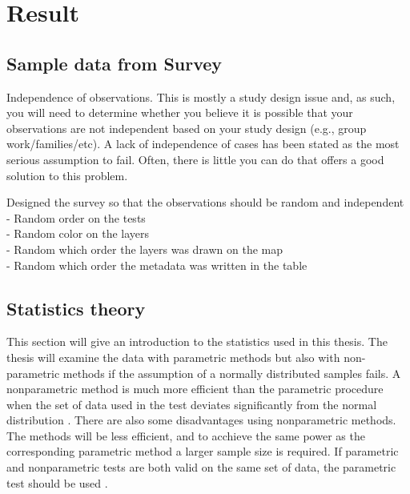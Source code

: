 \chapter{Result}


\section{Sample data from Survey}

Independence of observations. This is mostly a study design issue and, as such, you will need to determine whether you believe it is possible that your observations are not independent based on your study design (e.g., group work/families/etc). A lack of independence of cases has been stated as the most serious assumption to fail. Often, there is little you can do that offers a good solution to this problem. %


Designed the survey so that the observations should be random and independent \\
- Random order on the tests \\
- Random color on the layers \\
- Random which order the layers was drawn on the map \\
- Random which order the metadata was written in the table \\

\section{Statistics theory}\label{sec:statistic_theory}
This section will give an introduction to the statistics used in this thesis. The thesis will examine the data with parametric methods but also with non-parametric methods if the assumption of a normally distributed samples fails. A nonparametric method is much more efficient than the parametric procedure when the set of data used in the test deviates significantly from the normal distribution \citep{Walpole2012}. There are also some disadvantages using nonparametric methods. The methods will be less efficient, and to acchieve the same power as the corresponding parametric method a larger sample size is required. If parametric and nonparametric tests are both valid on the same set of data, the parametric test should be used \citep{Walpole2012}. 

